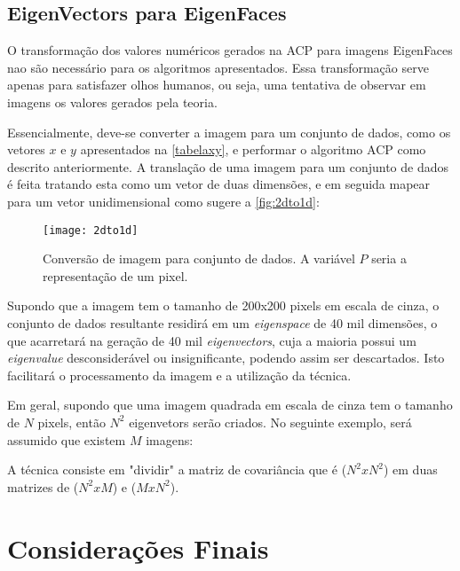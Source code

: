 \subsection{EigenVectors para EigenFaces}\label{subsec:vectoface}

O transformação dos valores numéricos gerados na ACP para imagens EigenFaces nao são necessário para os algoritmos apresentados. Essa transformação serve apenas para satisfazer olhos humanos, ou seja, uma tentativa de observar em imagens os valores gerados pela teoria.


Essencialmente, deve-se converter a imagem para um conjunto de dados, como os vetores $ x $ e $ y $ apresentados na \autoref{tabelaxy}, e performar o algoritmo ACP como descrito anteriormente. A translação de uma imagem para um conjunto de dados é feita tratando esta como um vetor de duas dimensões, e em seguida mapear para um vetor unidimensional como sugere a \autoref{fig:2dto1d}:

\begin{figure}[h]
	\centering
	\texttt{[image: 2dto1d]}
	\caption{Conversão de imagem para conjunto de dados. A variável $P$ seria a representação de um pixel.}
	\label{fig:2dto1d}
\end{figure}

Supondo que a imagem tem o tamanho de 200x200 pixels em escala de cinza, o conjunto de dados resultante residirá em um \textit{eigenspace} de 40 mil dimensões, o que acarretará na geração de 40 mil \textit{eigenvectors}, cuja a maioria possui um \textit{eigenvalue} desconsiderável ou insignificante, podendo assim ser descartados. Isto facilitará o processamento da imagem e a utilização da técnica. 

Em geral, supondo que uma imagem quadrada em escala de cinza tem o tamanho de  $ N $ pixels, então $N^2$ eigenvetors serão criados. No seguinte exemplo, será assumido que existem $ M $ imagens:

A técnica consiste em "dividir" a matriz de covariância que é ($ N^2 x N^2 $) em duas matrizes de ($ N^2 x M $) e ($ M x N^2 $). 




\section{Considerações Finais}\label{sec:revbib_consid_finais}

